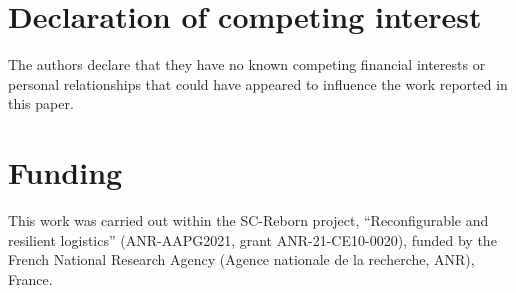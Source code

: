 \section*{Declaration of competing interest}

The authors declare that they have no known competing financial interests or personal relationships that could have appeared to influence the work reported in this paper.

\ifanonyme\else
\section*{Funding}

This work was carried out within the SC-Reborn project, ``Reconfigurable and resilient logistics'' (ANR-AAPG2021, grant ANR-21-CE10-0020), funded by the French National Research Agency (Agence nationale de la recherche, ANR), France.
\fi
